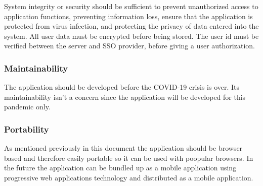 
System integrity or security should be sufficient to prevent unauthorized access to application functions, preventing information loss, ensure that the application is protected from virus infection, and protecting the privacy of data entered into the system.
All user data must be encrypted before being stored.
The user id must be verified between the server and SSO provider, before giving a user authorization.

\subsubsection{Maintainability}


The application should be developed before the COVID-19 crisis is over.
Its maintainability isn't a concern since the application will be developed for this pandemic only.

\subsubsection{Portability}


As mentioned previously in this document the application should be browser based and therefore easily portable so it can be used with poopular browsers.
In the future the application can be bundled up as a mobile application using progressive web applications technology and distributed as a mobile application.
